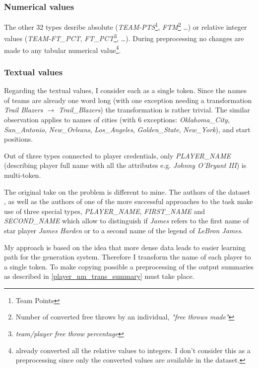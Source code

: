 \subsubsection{Numerical values}

The other 32 types desribe absolute (\emph{TEAM-PTS}\footnote{Team Points}, \emph{FTM}\footnote{Number of converted free throws by an individual, \emph{"free throws made"}} \dots) or relative integer values (\emph{TEAM-FT\_PCT}, \emph{FT\_PCT}\footnote{\emph{team/player free throw percentage}}, \dots). During preprocessing no changes are made to any tabular numerical value\footnote{\citep{wiseman2017} already converted all the relative values to integers. I don't consider this as a preprocessing since only the converted values are available in the dataset.}.

\subsubsection{Textual values} \label{trans_p_nms}

Regarding the textual values, I consider each as a single token. Since the names of teams are already one word long (with one exception needing a transformation \emph{Trail Blazers $\rightarrow$ Trail\_Blazers}) the transformation is rather trivial. The similar observation applies to names of cities (with 6 exceptions: \emph{Oklahoma\_City}, \emph{San\_Antonio}, \emph{New\_Orleans}, \emph{Los\_Angeles}, \emph{Golden\_State}, \emph{New\_York}), and start positions.

Out of three types connected to player credentials, only \emph{PLAYER\_NAME} (describing player full name with all the attributes e.g. \emph{Johnny O'Bryant III}) is multi-token.

The original take on the problem is different to mine. The authors of the dataset \citep{wiseman2017}, as well as the authors of one of the more successful approaches to the task \citep{puduppully2019datatotext} make use of three special types, \emph{PLAYER\_NAME}, \emph{FIRST\_NAME} and \emph{SECOND\_NAME} which allow to distinguish if \emph{James} refers to the first name of star player \emph{James Harden} or to a second name of the legend of \emph{LeBron James}.

My approach is based on the idea that more dense data leads to easier learning path for the generation system. Therefore I transform the name of each player to a single token. To make copying possible a preprocessing of the output summaries as described in \ref{player_nm_trans_summary} must take place. 

